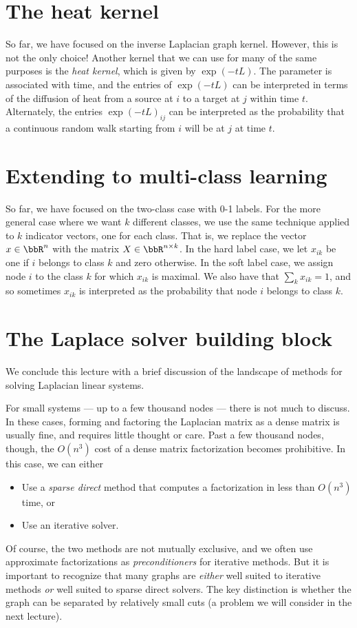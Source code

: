 \documentclass[12pt, leqno]{article} %
\begin{document}
\section{The heat kernel}

So far, we have focused on the inverse Laplacian graph kernel.
However, this is not the only choice!  Another kernel that we can use
for many of the same purposes is the {\em heat kernel}, which is given
by $\exp(-t L)$.  The parameter is associated with time, and the
entries of $\exp(-t L)$ can be interpreted in terms of the diffusion
of heat from a source at $i$ to a target at $j$ within time $t$.
Alternately, the entries $\exp(-t L)_{ij}$ can be interpreted as the
probability that a continuous random walk starting from $i$ will be
at $j$ at time $t$.

\section{Extending to multi-class learning}

So far, we have focused on the two-class case with 0-1 labels.
For the more general case where we want $k$ different classes,
we use the same technique applied to $k$ indicator vectors,
one for each class.  That is, we replace the vector $x \in \bbR^n$ with
the matrix $X \in \bbR^{n \times k}$.  In the hard label case, we let
$x_{ik}$ be one if $i$ belongs to class $k$ and zero otherwise.
In the soft label case, we assign node $i$ to the class $k$ for which
$x_{ik}$ is maximal.  We also have that $\sum_{k} x_{ik} = 1$, and
so sometimes $x_{ik}$ is interpreted as the probability that node $i$
belongs to class $k$.

\section{The Laplace solver building block}

We conclude this lecture with a brief discussion of the landscape of
methods for solving Laplacian linear systems.

For small systems --- up to a few thousand nodes --- there is not much
to discuss.  In these cases, forming and factoring the Laplacian
matrix as a dense matrix is usually fine, and requires little thought
or care.  Past a few thousand nodes, though, the $O(n^3)$ cost of
a dense matrix factorization becomes prohibitive.  In this case,
we can either
\begin{itemize}
\item Use a {\em sparse direct} method that computes a factorization
  in less than $O(n^3)$ time, or
\item Use an iterative solver.
\end{itemize}
Of course, the two methods are not mutually exclusive, and we often
use approximate factorizations as {\em preconditioners} for iterative
methods.  But it is important to recognize that many graphs are
{\em either} well suited to iterative methods {\em or} well suited
to sparse direct solvers.  The key distinction is whether the graph
can be separated by relatively small cuts (a problem we will consider
in the next lecture).
\end{document}
